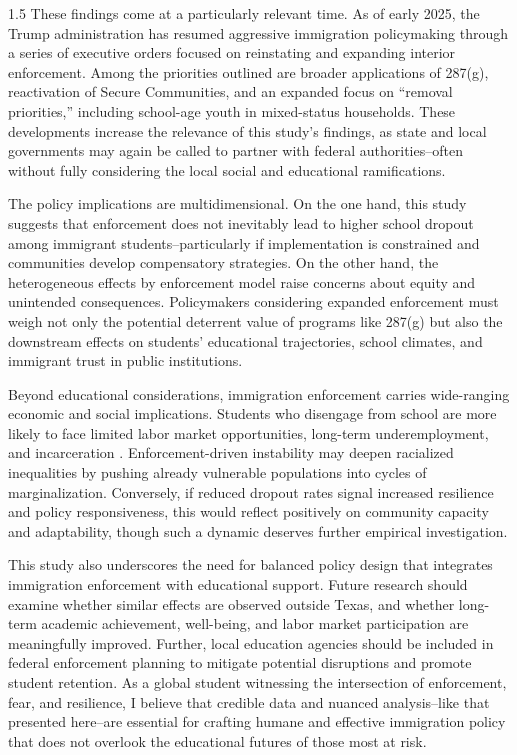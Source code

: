 \documentclass[12pt]{article}
\begin{document}
\begin{spacing}{1.5}
These findings come at a particularly relevant time. As of early 2025, the Trump administration has resumed aggressive immigration policymaking through a series of executive orders focused on reinstating and expanding interior enforcement. Among the priorities outlined are broader applications of 287(g), reactivation of Secure Communities, and an expanded focus on “removal priorities,” including school-age youth in mixed-status households. These developments increase the relevance of this study’s findings, as state and local governments may again be called to partner with federal authorities–often without fully considering the local social and educational ramifications.

The policy implications are multidimensional. On the one hand, this study suggests that enforcement does not inevitably lead to higher school dropout among immigrant students–particularly if implementation is constrained and communities develop compensatory strategies. On the other hand, the heterogeneous effects by enforcement model raise concerns about equity and unintended consequences. Policymakers considering expanded enforcement must weigh not only the potential deterrent value of programs like 287(g) but also the downstream effects on students’ educational trajectories, school climates, and immigrant trust in public institutions.

Beyond educational considerations, immigration enforcement carries wide-ranging economic and social implications. Students who disengage from school are more likely to face limited labor market opportunities, long-term underemployment, and incarceration \citep{suarez2010}. Enforcement-driven instability may deepen racialized inequalities by pushing already vulnerable populations into cycles of marginalization. Conversely, if reduced dropout rates signal increased resilience and policy responsiveness, this would reflect positively on community capacity and adaptability, though such a dynamic deserves further empirical investigation.

This study also underscores the need for balanced policy design that integrates immigration enforcement with educational support. Future research should examine whether similar effects are observed outside Texas, and whether long-term academic achievement, well-being, and labor market participation are meaningfully improved. Further, local education agencies should be included in federal enforcement planning to mitigate potential disruptions and promote student retention. As a global student witnessing the intersection of enforcement, fear, and resilience, I believe that credible data and nuanced analysis–like that presented here–are essential for crafting humane and effective immigration policy that does not overlook the educational futures of those most at risk.


\end{spacing}
\end{document}
